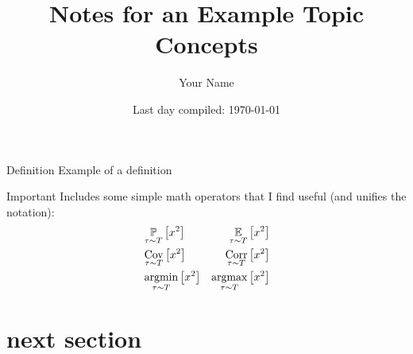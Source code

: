 \documentclass[letterpaper, 10pt]{article}
\title{Notes for an Example Topic Concepts}
\author{Your Name}
\date{Last day compiled: \today}
\begin{document}
\maketitle
\tableofcontents



\begin{definition}{Definition}
    Example of a definition
\end{definition}


\begin{important}[Reference]{Important}
    Includes some simple math operators that I find useful (and unifies the notation):
    \begin{align*}
        & \operatorname*{\mathbb{P}}_{\tau \sim T}\left[x^2\right] &  
        \operatorname*{\mathbb{E}}_{\tau \sim T}\left[x^2\right] \\
        & \operatorname*{Cov}_{\tau \sim T}\left[x^2\right] & 
        \operatorname*{Corr}_{\tau \sim T}\left[x^2\right] \\
        & \operatorname*{argmin}_{\tau \sim T}\left[x^2\right] &
        \operatorname*{argmax}_{\tau \sim T}\left[x^2\right]
    \end{align*}
\end{important}

\section{next section}


\end{document}
